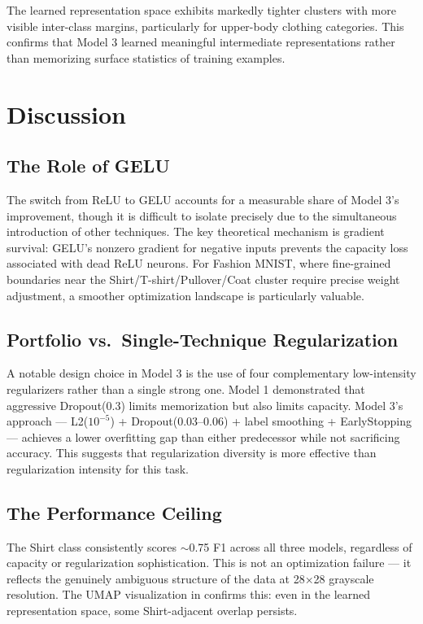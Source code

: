 \documentclass[12pt,letterpaper]{article}
\begin{document}
The learned representation space exhibits markedly tighter clusters with more visible inter-class margins, particularly for upper-body clothing categories. This confirms that Model 3 learned meaningful intermediate representations rather than memorizing surface statistics of training examples.

\section{Discussion}
\label{sec:discussion}

\subsection{The Role of GELU}

The switch from ReLU to GELU accounts for a measurable share of Model 3's improvement, though it is difficult to isolate precisely due to the simultaneous introduction of other techniques. The key theoretical mechanism is gradient survival: GELU's nonzero gradient for negative inputs prevents the capacity loss associated with dead ReLU neurons. For Fashion MNIST, where fine-grained boundaries near the Shirt/T-shirt/Pullover/Coat cluster require precise weight adjustment, a smoother optimization landscape is particularly valuable.

\subsection{Portfolio vs.\ Single-Technique Regularization}

A notable design choice in Model 3 is the use of four complementary low-intensity regularizers rather than a single strong one. Model 1 demonstrated that aggressive Dropout(0.3) limits memorization but also limits capacity. Model 3's approach — L2($10^{-5}$) + Dropout(0.03--0.06) + label smoothing + EarlyStopping — achieves a lower overfitting gap than either predecessor while not sacrificing accuracy. This suggests that regularization diversity is more effective than regularization intensity for this task.

\subsection{The Performance Ceiling}

The Shirt class consistently scores $\sim$0.75 F1 across all three models, regardless of capacity or regularization sophistication. This is not an optimization failure — it reflects the genuinely ambiguous structure of the data at 28×28 grayscale resolution. The UMAP visualization in  confirms this: even in the learned representation space, some Shirt-adjacent overlap persists.
\end{document}
